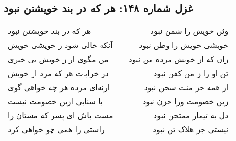 \begin{center}
\section*{غزل شماره ۱۴۸: هر که در بند خویشتن نبود}
\label{sec:148}
\begin{longtable}{l p{0.5cm} r}
هر که در بند خویشتن نبود
&&
وثن خویش را شمن نبود
\\
آنکه خالی شود ز خویشی خویش
&&
خویشی خویش را وطن نبود
\\
من مگوی ار ز خویش بی خبری
&&
زان که از خویش مرده من نبود
\\
در خرابات هر که مرد از خویش
&&
تن او را ز من کفن نبود
\\
ارنه‌ای مرده هر چه خواهی گوی
&&
از همه جز منت سخن نبود
\\
با سنایی ازین خصومت نیست
&&
زین خصومت ورا حزن نبود
\\
مست باش ای پسر که مستان را
&&
دل به تیمار ممتحن نبود
\\
راستی را همی چو خواهی کرد
&&
نیستی جز هلاک تن نبود
\\
\end{longtable}
\end{center}
